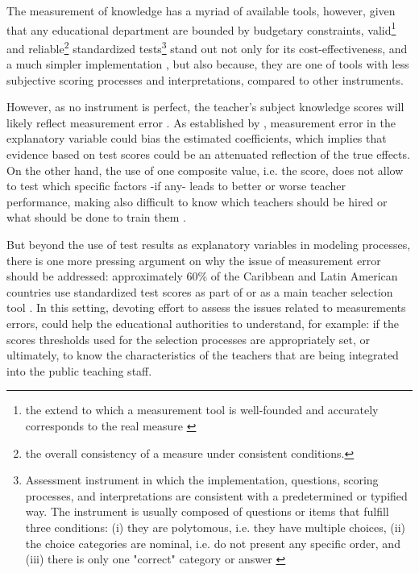 The measurement of knowledge has a myriad of available tools, however, given that any educational department are bounded by budgetary constraints, valid\footnote{the extend to which a measurement tool is well-founded and accurately corresponds to the real measure \citep{Kelley_1927}} and reliable\footnote{the overall consistency of a measure under consistent conditions.} standardized tests\footnote{Assessment instrument in which the implementation, questions, scoring processes, and interpretations are consistent with a predetermined or typified way. The instrument is usually composed of questions or items that fulfill three conditions: (i) they are polytomous, i.e. they have multiple choices, (ii) the choice categories are nominal, i.e. do not present any specific order, and (iii) there is only one "correct" category or answer \citep{Rivera_2019}} stand out not only for its cost-effectiveness, and a much simpler implementation \citep{Hincapie_et_al_2020}, but also because, they are one of tools with less subjective scoring processes and interpretations, compared to other instruments.

However, as no instrument is perfect, the teacher's subject knowledge scores will likely reflect measurement error \citep{Metzler_et_al_2012}. As established by \citet{Angrist_et_al_1999}, measurement error in the explanatory variable could bias the estimated coefficients, which implies that evidence based on test scores could be an attenuated reflection of the true effects. On the other hand, the use of one composite value, i.e. the score, does not allow to test which specific factors -if any- leads to better or worse teacher performance, making also difficult to know which teachers should be hired or what should be done to train them \citep{Hanushek_et_al_2012}.

But beyond the use of test results as explanatory variables in modeling processes, there is one more pressing argument on why the issue of measurement error should be addressed: approximately 60\% of the Caribbean and Latin American countries use standardized test scores as part of or as a main teacher selection tool \citep{Hincapie_et_al_2020}. In this setting, devoting effort to assess the issues related to measurements errors, could help the educational authorities to understand, for example: if the scores thresholds used for the selection processes are appropriately set, or ultimately, to know the characteristics of the teachers that are being integrated into the public teaching staff.

